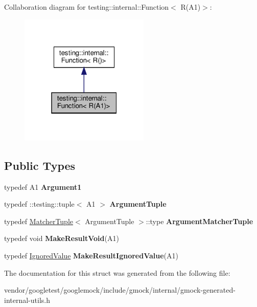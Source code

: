 Collaboration diagram for testing\+:\+:internal\+:\+:Function$<$ R(A1)$>$\+:
\nopagebreak
\begin{figure}[H]
\begin{center}
\leavevmode
\includegraphics[width=175pt]{structtesting_1_1internal_1_1_function_3_01_r_07_a1_08_4__coll__graph}
\end{center}
\end{figure}
\subsection*{Public Types}
\begin{DoxyCompactItemize}
\item 
\mbox{\label{structtesting_1_1internal_1_1_function_3_01_r_07_a1_08_4_aca36c8586218fd015cc4736dc8d4c14f}} 
typedef A1 {\bfseries Argument1}
\item 
\mbox{\label{structtesting_1_1internal_1_1_function_3_01_r_07_a1_08_4_afd48881a58d72658e547a170fb0f2087}} 
typedef \+::testing\+::tuple$<$ A1 $>$ {\bfseries Argument\+Tuple}
\item 
\mbox{\label{structtesting_1_1internal_1_1_function_3_01_r_07_a1_08_4_a0e35671ae43c3d3310893e1d6d895d06}} 
typedef \hyperlink{structtesting_1_1internal_1_1_matcher_tuple}{Matcher\+Tuple}$<$ Argument\+Tuple $>$\+::type {\bfseries Argument\+Matcher\+Tuple}
\item 
\mbox{\label{structtesting_1_1internal_1_1_function_3_01_r_07_a1_08_4_aab10495172953eb51fc3940c4c1e890a}} 
typedef void {\bfseries Make\+Result\+Void}(A1)
\item 
\mbox{\label{structtesting_1_1internal_1_1_function_3_01_r_07_a1_08_4_a8fa56b9e05cb029ec7c8415ee352f865}} 
typedef \hyperlink{classtesting_1_1internal_1_1_ignored_value}{Ignored\+Value} {\bfseries Make\+Result\+Ignored\+Value}(A1)
\end{DoxyCompactItemize}


The documentation for this struct was generated from the following file\+:\begin{DoxyCompactItemize}
\item 
vendor/googletest/googlemock/include/gmock/internal/gmock-\/generated-\/internal-\/utils.\+h\end{DoxyCompactItemize}

